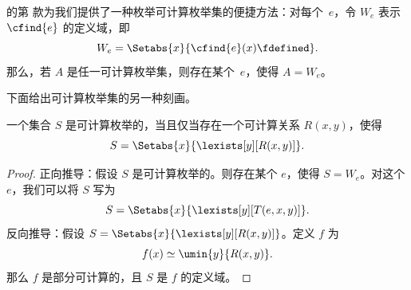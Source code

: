 \documentclass[../../../include/open-logic-section]{subfiles}
\begin{document}
 的第  款为我们提供了一种枚举可计算枚举集的便捷方法：对每个~$e$，令 $W_e$ 表示 $\cfind{e}$ 的定义域，即
\[
W_e = \Setabs{x}{\cfind{e}(x) \fdefined}.
\]
那么，若 $A$ 是任一可计算枚举集，则存在某个~$e$，使得 $A = W_e$。

下面给出可计算枚举集的另一种刻画。

\begin{thm}
一个集合 $S$ 是可计算枚举的，当且仅当存在一个可计算关系 $R(x,y)$，使得
\[
S = \Setabs{ x }{ \lexists[y][R(x,y)] }.
\]
\end{thm}

\begin{proof}
正向推导：假设 $S$ 是可计算枚举的。则存在某个 $e$，使得 $S = W_e$。对这个 $e$，我们可以将 $S$ 写为
\[
S = \Setabs{ x }{ \lexists[y][T(e, x, y)] }.
\]
反向推导：假设 $S = \Setabs{ x }{
  \lexists[y][R(x, y)] }$。定义 $f$ 为
\[
f(x) \simeq \umin{y}{R(x, y)}.
\]
那么 $f$ 是部分可计算的，且 $S$ 是 $f$ 的定义域。
\end{proof}
\end{document}
